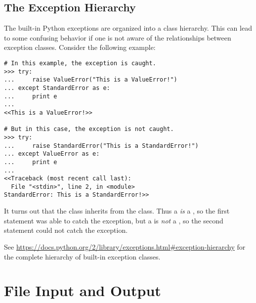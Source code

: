 \begin{comment}
\subsection*{Chaining Exceptions}
\begin{lstlisting}
>>> try:
>>>     raise ValueError("First Exception")
>>> except ValueError as e:
>>>     raise ZeroDivisionError("Second Exception") from e
\end{lstlisting}
\end{comment}

\subsection*{The Exception Hierarchy}

The built-in Python exceptions are organized into a class hierarchy.
This can lead to some confusing behavior if one is not aware of the relationships between exception classes.
Consider the following example:

\begin{lstlisting}
# In this example, the exception is caught.
>>> try:
...     raise ValueError("This is a ValueError!")
... except StandardError as e:
...     print e
...
<<This is a ValueError!>>

# But in this case, the exception is not caught.
>>> try:
...     raise StandardError("This is a StandardError!")
... except ValueError as e:
...     print e
...
<<Traceback (most recent call last):
  File "<stdin>", line 2, in <module>
StandardError: This is a StandardError!>>
\end{lstlisting}

It turns out that the  class inherits from the  class.
Thus a  \emph{is} a , so the first  statement was able to catch the exception, but a  is \emph{not} a , so the second  statement could not catch the exception.

See \url{https://docs.python.org/2/library/exceptions.html#exception-hierarchy} for the complete hierarchy of built-in exception classes.

\section*{File Input and Output} %

